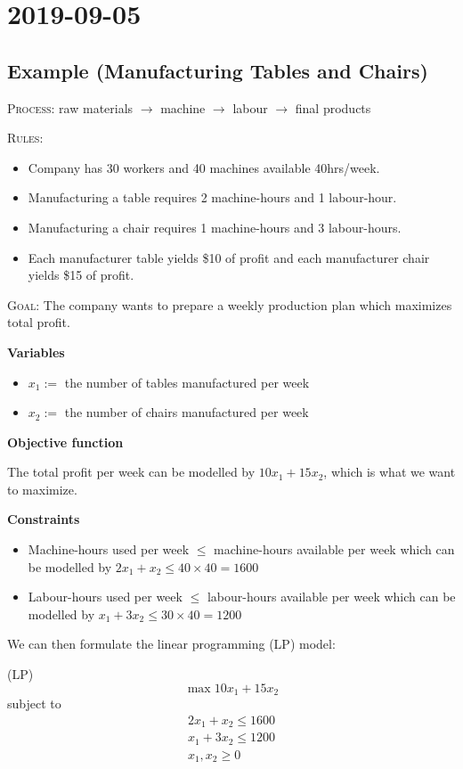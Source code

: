 \section{2019-09-05}
\subsection{Example (Manufacturing Tables and Chairs)}
\textsc{Process}: raw materials $\rightarrow$ machine $\rightarrow$ labour $\rightarrow$ final products

\textsc{Rules}:
\begin{itemize}
    \item Company has 30 workers and 40 machines available 40hrs/week.
    \item Manufacturing a table requires 2 machine-hours and 1 labour-hour.
    \item Manufacturing a chair requires 1 machine-hours and 3 labour-hours.
    \item Each manufacturer table yields \$10 of profit and each manufacturer chair yields \$15 of profit.
\end{itemize}

\textsc{Goal}: The company wants to prepare a weekly production plan which maximizes
total profit.

\textbf{Variables}
\begin{itemize}
    \item $x_1:=$ the number of tables manufactured per week
    \item $x_2:=$ the number of chairs manufactured per week
\end{itemize}

\textbf{Objective function}

The total profit per week can be modelled by $10x_1 + 15x_2$, which is what
we want to maximize.

\textbf{Constraints}
\begin{itemize}
    \item Machine-hours used per week $\le$  machine-hours available per week which
can be modelled by $2x_1 + x_2 \le  40 \times 40 = 1600$
    \item Labour-hours used per week $\le$ labour-hours available per week which can
    be modelled by $x_1 + 3x_2 \le 30 \times 40 = 1200$
\end{itemize}

We can then formulate the linear programming (LP) model:

(LP)
\[\max 10x_1 + 15x_2\]
subject to
\begin{align*}
    2x_1 + x_2 \le 1600\\
    x_1 + 3x_2 \le 1200\\
    x_1, x_2 \ge 0
\end{align*}


